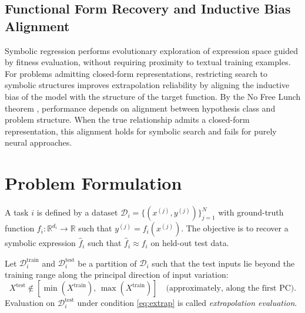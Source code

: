 \documentclass[twoside,11pt]{article}
\begin{document}
\subsection{Functional Form Recovery and Inductive Bias Alignment}\label{subsec:functional-form-recovery-and-inductive-b}
\label{sec:theory_recovery}

Symbolic regression performs evolutionary exploration of expression space guided by fitness evaluation, without requiring proximity to textual training examples. For problems admitting closed-form representations, restricting search to symbolic structures improves extrapolation reliability by aligning the inductive bias of the model with the structure of the target function. By the No Free Lunch theorem \citep{wolpert1997no}, performance depends on alignment between hypothesis class and problem structure. When the true relationship admits a closed-form representation, this alignment holds for symbolic search and fails for purely neural approaches.

\section{Problem Formulation}
\label{sec:problem}

\begin{definition}
A task $i$ is defined by a dataset $\mathcal{D}_i = \{(x^{(j)}, y^{(j)})\}_{j=1}^{N}$
with ground-truth function $f_i: \mathbb{R}^{d_i} \to \mathbb{R}$ such that
$y^{(j)} = f_i(x^{(j)})$.  The objective is to recover a symbolic expression
$\hat{f}_i$ such that $\hat{f}_i \approx f_i$ on held-out test data.
\end{definition}

\begin{definition}
Let $\mathcal{D}^{\mathrm{train}}_i$ and $\mathcal{D}^{\mathrm{test}}_i$ be a
partition of $\mathcal{D}_i$ such that the test inputs lie beyond the training range
along the principal direction of input variation:
\begin{equation}
  X^{\mathrm{test}} \notin [\min(X^{\mathrm{train}}),\, \max(X^{\mathrm{train}})]
  \quad \text{(approximately, along the first PC)}.
  \label{eq:extrap}
\end{equation}
Evaluation on $\mathcal{D}^{\mathrm{test}}_i$ under condition \eqref{eq:extrap}
is called \emph{extrapolation evaluation}.
\end{definition}
\end{document}
